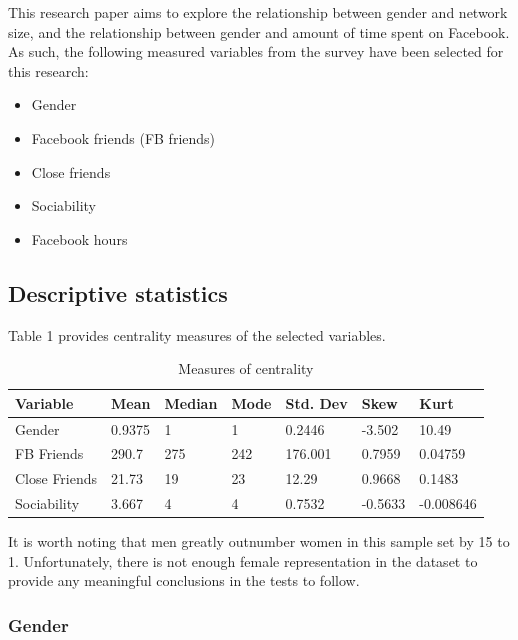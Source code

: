 This research paper aims to explore the relationship between gender and network size, and the relationship between gender and amount of time spent on Facebook. As such, the following measured variables from the survey have been selected for this research:

\begin{itemize}
\item Gender
\item Facebook friends (FB friends)
\item Close friends
\item Sociability
\item Facebook hours
\end{itemize}

\subsection{Descriptive statistics}

Table 1 provides centrality measures of the selected variables.

\begin{table}[H]
\centering
\caption{Measures of centrality}
\begin{tabular}{l|l|l|l|l|l|l}
Variable      & Mean   & Median & Mode & Std. Dev & Skew    & Kurt      \\ \hline
Gender        & 0.9375 & 1      & 1    & 0.2446   & -3.502  & 10.49     \\ \hline
FB Friends    & 290.7  & 275    & 242  & 176.001  & 0.7959  & 0.04759   \\ \hline
Close Friends & 21.73  & 19     & 23   & 12.29    & 0.9668  & 0.1483    \\ \hline
Sociability   & 3.667  & 4      & 4    & 0.7532   & -0.5633 & -0.008646 \\ \hline
\end{tabular}
\end{table}


It is worth noting that men greatly outnumber women in this sample set by 15 to 1. Unfortunately, there is not enough female representation in the dataset to provide any meaningful conclusions in the tests to follow.

\subsubsection{Gender}

